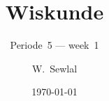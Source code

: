 \documentclass{beamer}
\title{Wiskunde}
\date{\today}
\subtitle{Periode~5 --- week~1}
\author{W.~Sewlal}
\begin{document}
\frame{\titlepage}
% 
% 

\end{document}
